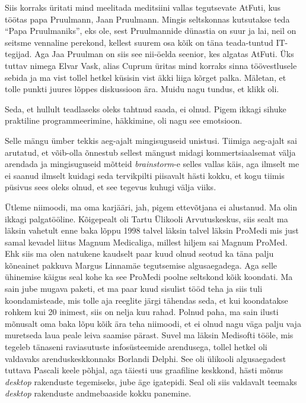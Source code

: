 Siis korraks üritati mind meelitada meditsiini vallas tegutsevate AtFuti, kus töötas papa Pruulmann, Jaan Pruulmann. Mingis seltskonnas kutsutakse teda \enquote{Papa  Pruulmaniks}, eks ole, sest Pruulmannide dünastia on suur ja lai, neil on seitsme vennaline perekond, kellest suurem osa kõik on täna teada-tuntud IT-tegijad. Aga Jaa Pruulman on siis see nii-öelda seenior, kes algatas AtFuti. Üks tuttav nimega Elvar Vask, alias Cuprum üritas mind korraks sinna töövestlusele sebida ja ma vist tollel hetkel küsisin vist äkki liiga kõrget palka. Mäletan, et tolle punkti juures lõppes diskussioon ära. Muidu nagu tundus, et klikk oli. 


Seda, et hullult teadlaseks oleks tahtnud saada, ei olnud. Pigem ikkagi sihuke  praktiline programmeerimine, häkkimine, oli nagu see emotsioon. 


Selle mängu ümber tekkis aeg-ajalt mingisuguseid unistusi. Tiimiga aeg-ajalt sai arutatud, et võib-olla õnnestub sellest mängust midagi kommertsiaalsemat välja arendada ja mingisuguseid mõtteid \emph{brainstorm}-e selles vallas käis, aga ilmselt me ei saanud ilmselt kuidagi seda tervikpilti piisavalt hästi kokku, et kogu tiimis püsivus sees oleks olnud, et see tegevus kuhugi välja viiks. 

Ütleme niimoodi, ma oma karjääri, jah, pigem ettevõtjana ei alustanud. Ma olin ikkagi palgatööline. Kõigepealt oli Tartu Ülikooli Arvutuskeskus, siis sealt ma läksin vahetult enne baka lõppu 1998 talvel  läksin talvel läksin ProMedi mis just samal kevadel liitus Magnum Medicaliga, millest hiljem sai Magnum ProMed. Ehk siis ma olen natukene kaudselt paar kuud olnud seotud ka täna palju kõneainet pakkuva Margus Linnamäe tegutsemise algusaegadega. Aga selle ühinemise käigus seal kohe ka see ProMedi poolne seltskond kõik koondati. Ma sain jube mugava paketi, et ma paar kuud sisulist tööd teha ja siis tuli koondamisteade, mis tolle aja reeglite järgi tähendas seda, et kui koondatakse rohkem kui 20 inimest, siis on nelja kuu rahad. Polnud paha, ma sain ilusti mõnusalt oma baka lõpu kõik ära teha niimoodi, et ei olnud nagu väga palju vaja muretseda laua peale leiva saamise pärast.  Suvel ma läksin Medisofti tööle, mis tegeleb tänaseni  raviasutuste infosüsteemide arendusega, tollel hetkel oli valdavaks arenduskeskkonnaks Borlandi Delphi. See oli ülikooli algusaegadest tuttava Pascali keele põhjal, aga täiesti uus graafiline keskkond, hästi mõnus \emph{desktop} rakenduste tegemiseks, jube äge igatepidi. Seal oli siis valdavalt teemaks \emph{desktop} rakenduste andmebaaside kokku panemine. 

